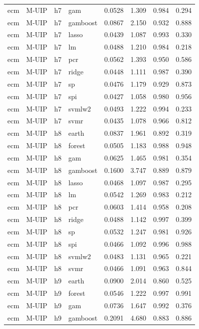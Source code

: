 \begin{ThreePartTable}
\begin{longtable}[t]{llclcccc}
ecm & M-UIP & h7 & gam & 0.0528 & 1.309 & 0.984 & 0.294\\
ecm & M-UIP & h7 & gamboost & 0.0867 & 2.150 & 0.932 & 0.888\\
ecm & M-UIP & h7 & lasso & 0.0439 & 1.087 & 0.993 & 0.330\\
ecm & M-UIP & h7 & lm & 0.0488 & 1.210 & 0.984 & 0.218\\
ecm & M-UIP & h7 & pcr & 0.0562 & 1.393 & 0.950 & 0.586\\
ecm & M-UIP & h7 & ridge & 0.0448 & 1.111 & 0.987 & 0.390\\
ecm & M-UIP & h7 & sp & 0.0476 & 1.179 & 0.929 & 0.873\\
ecm & M-UIP & h7 & spi & 0.0427 & 1.058 & 0.980 & 0.956\\
ecm & M-UIP & h7 & svmlw2 & 0.0493 & 1.222 & 0.994 & 0.233\\
ecm & M-UIP & h7 & svmr & 0.0435 & 1.078 & 0.966 & 0.812\\
\addlinespace
ecm & M-UIP & h8 & earth & 0.0837 & 1.961 & 0.892 & 0.319\\
ecm & M-UIP & h8 & forest & 0.0505 & 1.183 & 0.988 & 0.948\\
ecm & M-UIP & h8 & gam & 0.0625 & 1.465 & 0.981 & 0.354\\
ecm & M-UIP & h8 & gamboost & 0.1600 & 3.747 & 0.889 & 0.879\\
ecm & M-UIP & h8 & lasso & 0.0468 & 1.097 & 0.987 & 0.295\\
ecm & M-UIP & h8 & lm & 0.0542 & 1.269 & 0.983 & 0.212\\
ecm & M-UIP & h8 & pcr & 0.0603 & 1.414 & 0.958 & 0.208\\
ecm & M-UIP & h8 & ridge & 0.0488 & 1.142 & 0.997 & 0.399\\
ecm & M-UIP & h8 & sp & 0.0532 & 1.247 & 0.981 & 0.926\\
ecm & M-UIP & h8 & spi & 0.0466 & 1.092 & 0.996 & 0.988\\
ecm & M-UIP & h8 & svmlw2 & 0.0483 & 1.131 & 0.965 & 0.221\\
ecm & M-UIP & h8 & svmr & 0.0466 & 1.091 & 0.963 & 0.844\\
\addlinespace
ecm & M-UIP & h9 & earth & 0.0900 & 2.014 & 0.860 & 0.525\\
ecm & M-UIP & h9 & forest & 0.0546 & 1.222 & 0.997 & 0.991\\
ecm & M-UIP & h9 & gam & 0.0736 & 1.647 & 0.992 & 0.376\\
ecm & M-UIP & h9 & gamboost & 0.2091 & 4.680 & 0.883 & 0.886\\

\end{longtable}
\end{ThreePartTable}
